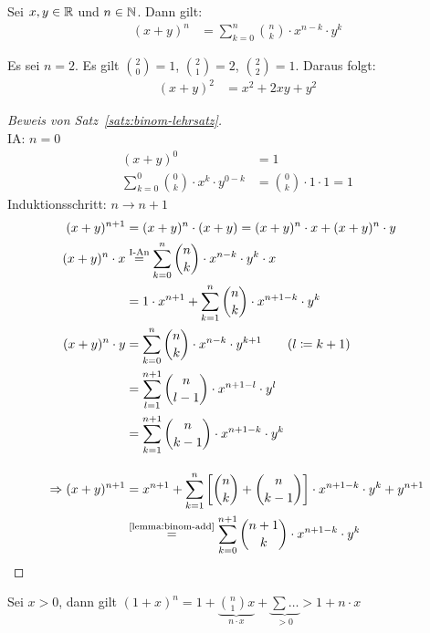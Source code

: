 \begin{satz}
    \label{satz:binom-lehrsatz}
    Sei $x,y\in\mathbb{R}$ und $n\in\mathbb{N}$. Dann gilt:
    \begin{align*}
    (x+y)
        ^{n} &= \sum_{k=0}^{n} \binom{n}{k}\cdot x^{n-k}\cdot y^k
    \end{align*}
\end{satz}
\begin{beispiel}
    Es sei $n=2$. Es gilt $\binom{2}{0}=1$, $\binom{2}{1}=2$, $\binom{2}{2}=1$. Daraus folgt:
    \begin{align*}
    (x+y)
        ^{2} &= x^2+2xy+y^2
    \end{align*}
\end{beispiel}
\begin{proof}[Beweis von Satz~\ref{satz:binom-lehrsatz}]
    ~\\IA: $n=0$
    \begin{align*}
    (x+y)
        ^0&=1\\
        \sum_{k=0}^0\binom{0}{k}\cdot x^{k}\cdot y^{0-k} &= \binom{0}{k}\cdot 1\cdot 1 = 1
    \end{align*}
    Induktionsschritt: $n\rightarrow n+1$
    \begin{align*}
    (x+y)
        ^{n+1} &= (x+y)^n\cdot (x+y) = (x+y)^n \cdot x + (x+y)^n\cdot y\\
        (x+y)^n\cdot x &\annot{=}{I-An} \sum_{k=0}^{n}\binom{n}{k}\cdot x^{n-k}\cdot y^k\cdot x\\
        &=1\cdot x^{n+1} + \sum_{k=1}^{n} \binom{n}{k}\cdot x^{n+1-k}\cdot y^{k}\\
        (x+y)^n\cdot y &= \sum_{k=0}^{n}\binom{n}{k}\cdot x^{n-k}\cdot y^{k+1}\tag{$l\definedas k+1$}\\
        &= \sum_{l=1}^{n+1} \binom{n}{l-1}\cdot x^{n+1-l}\cdot y^{l}\\
        &= \sum_{k=1}^{n+1} \binom{n}{k-1}\cdot x^{n+1-k} \cdot y^{k}\\[10pt]
        \impl (x+y)^{n+1} &= x^{n+1} + \sum_{k=1}^{n} \interv{\binom{n}{k}+\binom{n}{k-1}} \cdot x^{n+1-k}\cdot y^k + y^{n+1}\\
        &\annot{=}{\ref{lemma:binom-add}} \sum_{k=0}^{n+1} \binom{n+1}{k}\cdot x^{n+1-k}\cdot y^{k}\qedhere
    \end{align*}
\end{proof}

\begin{bemerkung}
    Sei $x>0$, dann gilt $(1+x)^n = 1+\underbrace{\binom{n}{1}x}_{n\cdot x} + \underbrace{\sum \dots}_{>0} > 1 + n\cdot x$
\end{bemerkung}

